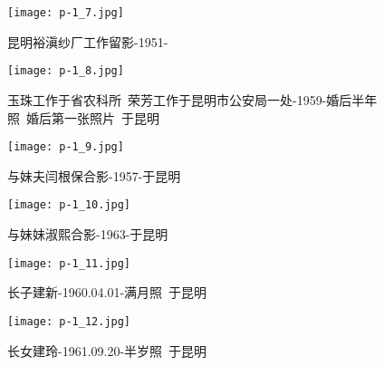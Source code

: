 \begin{figure}
    \begin{center}
        \texttt{[image: p-1\_7.jpg]}
        \caption{昆明裕滇纱厂工作留影-1951-}
    \end{center}
\end{figure}

\clearpage


\begin{figure}
    \begin{center}
        \texttt{[image: p-1\_8.jpg]}
        \caption{玉珠工作于省农科所~荣芳工作于昆明市公安局一处-1959-婚后半年照~婚后第一张照片~于昆明}
    \end{center}
\end{figure}

\clearpage


\begin{figure}
    \begin{center}
        \texttt{[image: p-1\_9.jpg]}
        \caption{与妹夫闫根保合影-1957-于昆明}
    \end{center}
\end{figure}

\clearpage


\begin{figure}
    \begin{center}
        \texttt{[image: p-1\_10.jpg]}
        \caption{与妹妹淑熙合影-1963-于昆明}
    \end{center}
\end{figure}

\clearpage


\begin{figure}
    \begin{center}
        \texttt{[image: p-1\_11.jpg]}
        \caption{长子建新-1960.04.01-满月照~于昆明}
    \end{center}
\end{figure}

\clearpage


\begin{figure}
    \begin{center}
        \texttt{[image: p-1\_12.jpg]}
        \caption{长女建玲-1961.09.20-半岁照~于昆明}
    \end{center}
\end{figure}

\clearpage


